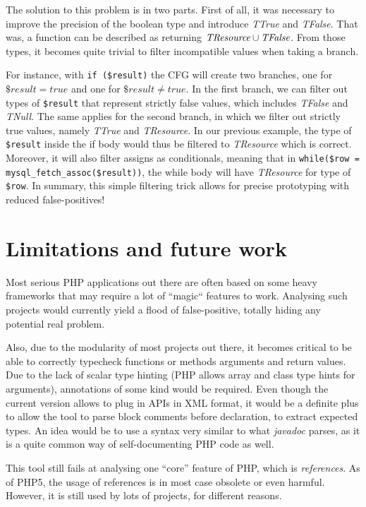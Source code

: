 \documentclass[a4paper]{article}
\begin{document}
The solution to this problem is in two parts. First of all, it was necessary to
improve the precision of the boolean type and introduce \emph{TTrue} and
\emph{TFalse}.  That was, a function can be described as returning
$\emph{TResource} \cup \emph{TFalse}$.  From those types, it becomes quite
trivial to filter incompatible values when taking a branch.

For instance, with \verb/if ($result)/ the CFG will create two branches, one
for $\$result = true$ and one for $\$result \neq true$. In the first branch, we
can filter out types of \verb/$result/ that represent strictly false values,
which includes \emph{TFalse} and \emph{TNull}. The same applies for the second
branch, in which we filter out strictly true values, namely \emph{TTrue} and
\emph{TResource}. In our previous example, the type of \verb/$result/ inside
the if body would thus be filtered to \emph{TResource} which is correct.
Moreover, it will also filter assigns as conditionals, meaning that in 
\verb/while($row = mysql_fetch_assoc($result))/, the while body will have
\emph{TResource} for type of \verb/$row/. In summary, this simple filtering
trick allows for precise prototyping with reduced false-positives!

\section{Limitations and future work}
Most serious PHP applications out there are often based on some heavy frameworks
that may require a lot of ``magic`` features to work. Analysing such projects
would currently yield a flood of false-positive, totally hiding any potential
real problem.

Also, due to the modularity of most projects out there, it becomes critical to
be able to correctly typecheck functions or methods arguments and return values.
Due to the lack of scalar type hinting (PHP allows array and class type hints
for arguments), annotations of some kind would be required. Even though the
current version allows to plug in APIs in XML format, it would be a definite
plus to allow the tool to parse block comments before declaration, to extract
expected types. An idea would be to use a syntax very similar to what
\emph{javadoc} parses, as it is a quite common way of self-documenting PHP
code as well.

This tool still fails at analysing one ``core'' feature of PHP, which is
\emph{references}. As of PHP5, the usage of references is in most case obsolete
or even harmful. However, it is still used by lots of projects, for different
reasons.
\end{document}
